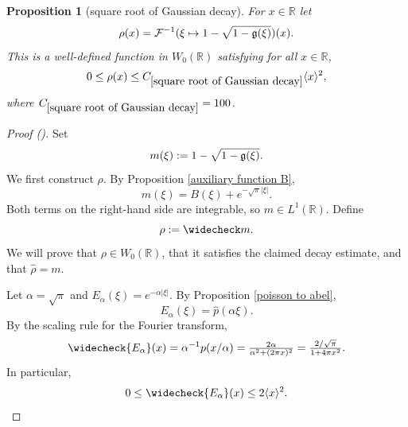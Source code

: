 \documentclass[12pt,reqno]{amsart}
\newcommand{\auto}{{({\tiny\faCar})}}
\theoremstyle{plain}
\newtheorem{proposition}[theorem]{Proposition}
\numberwithin{equation}{section}
\theoremstyle{remark}
\newcommand{\using}[1]{}
\newcommand{\R}{{\mathbb R}}
\begin{document}
\begin{proposition}[square root of Gaussian decay]\label{square root of Gaussian decay}\using{auxiliary function B}\using{poisson to abel}\using{Elementary Gaussian properties}
For $x\in\R$ let
\begin{equation}\label{auto:inverse-Fourier-square-root-Gaussian} \rho(x) = \mathcal{F}^{-1}(\xi \mapsto 1- \sqrt{1-\mathfrak{g}(\xi)})(x). \end{equation}
This is a well-defined function in $W_0(\R)$ satisfying for all $x\in\R$,
\begin{equation} \label{sqr gauss C}
    0\le \rho(x) \le C_{\ref{square root of Gaussian decay}} \langle x\rangle^2,
\end{equation}
where $C_{\ref{square root of Gaussian decay}}=100$.
\end{proposition}
\begin{proof}[Proof \auto]
Set
\[
    m(\xi):=1-\sqrt{1-\mathfrak{g}(\xi)}.
\]
We first construct \(\rho\). By Proposition \ref{auxiliary function B},
\[
    m(\xi)=B(\xi)+e^{-\sqrt{\pi}|\xi|}.
\]
Both terms on the right-hand side are integrable, so \(m\in L^1(\R)\). Define
\[
    \rho:=\widecheck m.
\]
We will prove that \(\rho\in W_0(\R)\), that it satisfies the claimed decay estimate, and that
\(\widehat\rho=m\).

Let \(\alpha=\sqrt{\pi}\) and \(E_\alpha(\xi)=e^{-\alpha|\xi|}\). By Proposition
\ref{poisson to abel},
\[
    E_\alpha(\xi)=\widehat p(\alpha \xi).
\]
By the scaling rule for the Fourier transform,
\[
    \widecheck{E_\alpha}(x)
    =
    \alpha^{-1}p(x/\alpha)
    =
    \tfrac{2\alpha}{\alpha^2+(2\pi x)^2}
    =
    \tfrac{2/\sqrt{\pi}}{1+4\pi x^2}.
\]
In particular,
\begin{equation}\label{eq:abel-decay}
    0\le \widecheck{E_\alpha}(x)\le 2\langle x\rangle^{2}.
\end{equation}


\end{proof}
\end{document}
